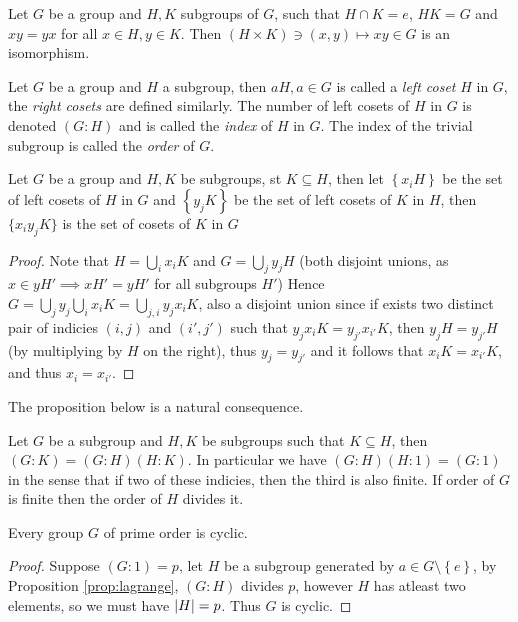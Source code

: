 \begin{proposition}\label{prop:}
  Let $G$ be a group and $H, K$ subgroups of $G$, such that $H \cap K = e$, $H K = G$ and $xy = yx$ for all $x \in H, y \in K$. Then $(H \times K) \ni (x, y) \mapsto xy \in G$ is an isomorphism.
\end{proposition}

Let $G$ be a group and $H$ a subgroup, then $aH, a \in G$ is called a \textit{left coset} $H$ in $G$, the \textit{right cosets} are defined similarly. The number of left cosets of $H$ in $G$ is denoted $(G : H)$ and is called the \textit{index}
of $H$ in $G$. The index of the trivial subgroup is called the \textit{order}
of $G$.

\begin{proposition}
  Let $G$ be a group and $H, K$ be subgroups, st $K \subseteq H$, then let $\left\{x_iH\right\}$ be the set of left cosets of $H$ in $G$ and $\left\{y_jK\right\}$ be the set of left cosets of $K$ in $H$, then $\{x_{i}y_{j}K\}$ is the set of cosets of $K$ in $G$
\end{proposition}
\begin{proof}
  Note that $H = \bigcup_i x_iK$ and $G = \bigcup_j y_j H$ (both disjoint unions, as $x \in yH' \implies xH' = yH'$ for all subgroups $H'$)
  Hence $G = \bigcup_j y_{j} \bigcup_i x_i K = \bigcup_{j, i} y_j x_i K$, also a disjoint union since if exists two distinct pair of indicies $(i, j)$ and $(i', j')$ such that $y_jx_iK = y_{j' }x_{i' }K$, then $y_j H = y_{j'} H$ (by multiplying by $H$ on the right), thus $y_j = y_{j'}$ and it follows that $x_i K = x_{i'} K$, and thus $x_i = x_{i'}$.
\end{proof}

The proposition below is a natural consequence.
\begin{proposition}\label{prop:lagrange}
  Let $G$ be a subgroup and $H, K$ be subgroups such that $K \subseteq H$, then $(G : K) = (G : H)(H : K)$. In particular we have $(G : H)(H : 1) = (G : 1)$  in the sense that if two of these indicies, then the third is also finite. If order of $G$ is finite then the order of $H$ divides it.
\end{proposition}

\begin{corollary}
  Every group $G$ of prime order is cyclic.
\end{corollary}
\begin{proof}
Suppose $(G : 1) = p$, let $H$ be a subgroup generated by $a \in G \setminus \left\{e\right\}$, by Proposition \ref{prop:lagrange}, $(G : H)$ divides $p$, however $H$ has atleast two elements, so we must have $\left\lvert H\right\rvert = p$. Thus $G$ is cyclic.
\end{proof}
